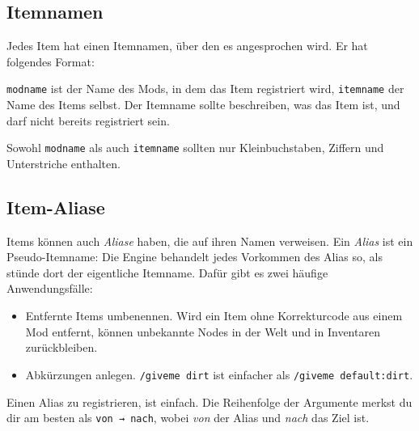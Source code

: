 \subsection{Itemnamen}\label{itemnamen}

Jedes Item hat einen Itemnamen, über den es angesprochen wird. Er hat
folgendes Format:

\begin{Shaded}
\begin{Highlighting}[]
\end{Highlighting}
\end{Shaded}

\texttt{modname} ist der Name des Mods, in dem das Item registriert
wird, \texttt{itemname} der Name des Items selbst. Der Itemname sollte
beschreiben, was das Item ist, und darf nicht bereits registriert sein.

Sowohl \texttt{modname} als auch \texttt{itemname} sollten nur
Kleinbuchstaben, Ziffern und Unterstriche enthalten.

\subsection{Item-Aliase}\label{item-aliase}

Items können auch \emph{Aliase} haben, die auf ihren
Namen verweisen. Ein \emph{Alias} ist ein Pseudo-Itemname: Die Engine
behandelt jedes Vorkommen des Alias so, als stünde dort der eigentliche
Itemname. Dafür gibt es zwei häufige Anwendungsfälle:

\begin{itemize}
\tightlist
\item
  Entfernte Items umbenennen. Wird ein Item ohne Korrekturcode aus einem
  Mod entfernt, können unbekannte Nodes in der Welt und in Inventaren
  zurückbleiben.
\item
  Abkürzungen anlegen. \texttt{/\allowbreak{}giveme dirt} ist einfacher
  als \texttt{/\allowbreak{}giveme default:dirt}.
\end{itemize}

Einen Alias zu registrieren, ist einfach. Die Reihenfolge der Argumente
merkst du dir am besten als \texttt{von → nach}, wobei \emph{von} der
Alias und \emph{nach} das Ziel ist.

\begin{Shaded}
\begin{Highlighting}[]
\OperatorTok{(}\OperatorTok{,} \OperatorTok{)}
\end{Highlighting}
\end{Shaded}

